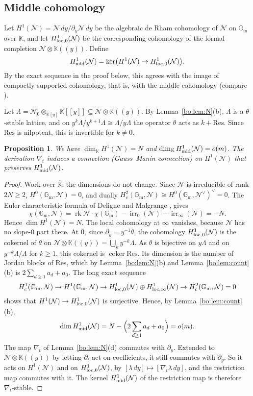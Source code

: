 \documentclass[11pt,a4paper]{article}
\newtheorem{proposition}[theorem]{Proposition}
\theoremstyle{definition}
\theoremstyle{remark}
\numberwithin{equation}{section}
\newcommand{\Gm}{\mathbb{G}_{\mathrm{m}}}
\newcommand{\Kt}{\mathbb{K}}
\newcommand{\cN}{\mathcal{N}}
\DeclareMathOperator{\rk}{rk}
\DeclareMathOperator{\irr}{irr}
\begin{document}
\subsection{Middle cohomology}
Let $H^1(\cN)=\cN\,dy/\partial_y\cN\,dy$ be the algebraic de Rham cohomology of $\cN$ on $\Gm$ over $\Kt$, and let $H^1_{\rm loc,0}(\cN)$ be the corresponding cohomology of the formal completion $\cN\otimes \Kt((y))$. Define
\[
H^1_{\rm mid}(\cN)=\ker\bigl(H^1(\cN)\to H^1_{\rm loc,0}(\cN)\bigr).
\]
By the exact sequence in the proof below, this agrees with the image of compactly supported cohomology, that is, with the middle cohomology (compare \cite{FSY22}).

Let $\Lambda=\cN_0\otimes_{\Kt[y]}\Kt[[y]]\subseteq\cN\otimes\Kt((y))$. By Lemma~\ref{bo:lem:N}(b), $\Lambda$ is a $\theta$-stable lattice, and on $y^k\Lambda/y^{k+1}\Lambda\cong\Lambda/y\Lambda$ the operator $\theta$ acts as $k+\mathrm{Res}$. Since $\mathrm{Res}$ is nilpotent, this is invertible for $k\ne0$.

\begin{proposition}\label{bo:prop:dimmid}
We have $\dim_{\Kt}H^1(\cN)=N$ and $\dim_{\Kt}H^1_{\rm mid}(\cN)=o(m)$. The derivation $\nabla_t$ induces a connection (Gauss--Manin connection) on $H^1(\cN)$ that preserves $H^1_{\rm mid}(\cN)$.
\end{proposition}

\begin{proof}
Work over $\overline{\Kt}$; the dimensions do not change. Since $\cN$ is irreducible of rank $2N\ge2$, $H^0(\Gm,\cN)=0$, and dually $H^2_c(\Gm,\cN)\cong H^0(\Gm,\cN^\vee)^\vee=0$. The Euler characteristic formula of Deligne and Malgrange \cite{Mal74}, \cite[Ch.~IV]{Mal91} gives
\[
\chi(\Gm,\cN)=\rk\cN\cdot\chi(\Gm)-\irr_0(\cN)-\irr_\infty(\cN)=-N .
\]
Hence $\dim H^1(\cN)=N$. The local cohomology at $\infty$ vanishes, because $\cN$ has no slope-$0$ part there. At $0$, since $\partial_y=y^{-1}\theta$, the cohomology $H^1_{\rm loc,0}(\cN)$ is the cokernel of $\theta$ on $\cN\otimes\Kt((y))=\bigcup_k y^{-k}\Lambda$. As $\theta$ is bijective on $y\Lambda$ and on $y^{-k}\Lambda/\Lambda$ for $k\ge1$, this cokernel is $\operatorname{coker}\mathrm{Res}$. Its dimension is the number of Jordan blocks of $\mathrm{Res}$, which by Lemma~\ref{bo:lem:N}(b) and Lemma~\ref{bo:lem:count}(b) is $2\sum_{d\ge1}a_d+a_0$. The long exact sequence
\[
H^1_c(\Gm,\cN)\to H^1(\Gm,\cN)\to H^1_{\rm loc,0}(\cN)\oplus H^1_{\rm loc,\infty}(\cN)\to H^2_c(\Gm,\cN)=0
\]
shows that $H^1(\cN)\to H^1_{\rm loc,0}(\cN)$ is surjective. Hence, by Lemma~\ref{bo:lem:count}(b),
\[
\dim H^1_{\rm mid}(\cN)=N-\Bigl(2\sum_{d\ge1}a_d+a_0\Bigr)=o(m).
\]
The map $\nabla_t$ of Lemma~\ref{bo:lem:N}(d) commutes with $\partial_y$. Extended to $\cN\otimes \Kt((y))$ by letting $\partial_t$ act on coefficients, it still commutes with $\partial_y$. So it acts on $H^1(\cN)$ and on $H^1_{\rm loc,0}(\cN)$, by $[\lambda\,dy]\mapsto[\nabla_t\lambda\,dy]$, and the restriction map commutes with it. The kernel $H^1_{\rm mid}(\cN)$ of the restriction map is therefore $\nabla_t$-stable.
\end{proof}
\end{document}
